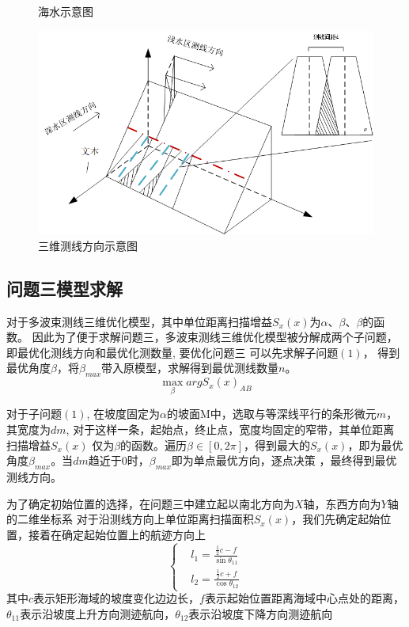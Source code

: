 \documentclass[withoutpreface,bwprint]{cumcmthesis} %
\begin{document}
\begin{figure}[htbp]
\begin{minipage}[c]{0.48\textwidth}
        \label{32}
    \end{minipage}
    \caption{海水示意图}
\end{figure}




    \begin{figure}[htbp]
        \centering
        \includegraphics[width=.8\textwidth]{第三问4.png}
        \caption{三维测线方向示意图}
        \label{18}
    \end{figure}



    \subsection{问题三模型求解}
    对于多波束测线三维优化模型，其中单位距离扫描增益$S_x(x)$为$\alpha$、$\beta$、$\beta$的函数。
    因此为了便于求解问题三，多波束测线三维优化模型被分解成两个子问题，即最优化测线方向和最优化测数量, 要优化问题三
    可以先求解子问题$(1)$， 得到最优角度$\beta$，将$\beta_{max}$带入原模型，求解得到最优测线数量$n$。
    \begin{equation}
        \max_{\beta} arg S_x(x)_{AB}
    \end{equation}

    对于子问题$(1)$,
    在坡度固定为$\alpha$的坡面M中，选取与等深线平行的条形微元$m$，其宽度为$dm$, 对于这样一条，起始点，终止点，宽度均固定的窄带，其单位距离扫描增益$S_x(x)$
    仅为$\beta$的函数。遍历$\beta \in [0,2\pi]$，得到最大的$S_x(x)$，即为最优角度$\beta_{max}$。当$dm$趋近于0时，$\beta_{max}$即为单点最优方向，逐点决策
    ，最终得到最优测线方向。

    为了确定初始位置的选择，在问题三中建立起以南北方向为$X$轴，东西方向为$Y$轴的二维坐标系
    对于沿测线方向上单位距离扫描面积$S_x(x)$，我们先确定起始位置，接着在确定起始位置上的航迹方向上
    \begin{equation}
        \left\{
        \begin{aligned}
            & l_1=\frac{\frac{1}{2} c-f}{\sin \theta_{11}} \\
            & l_2=\frac{\frac{1}{2} c+f}{\cos \theta_{12}}
        \end{aligned}
        \right.
    \end{equation} 
    其中$c$表示矩形海域的坡度变化边边长，$f$表示起始位置距离海域中心点处的距离，$\theta_{11}$表示沿坡度上升方向测迹航向，$\theta_{12}$表示沿坡度下降方向测迹航向
\end{document}
